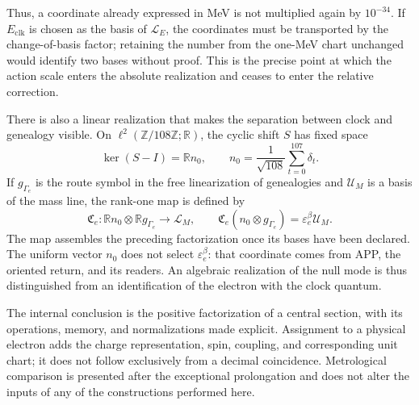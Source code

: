 Thus, a coordinate already expressed in MeV is not multiplied again
by \(10^{-34}\). If \(E_{\mathrm{clk}}\) is chosen as the basis of
\(\mathcal L_E\), the coordinates must be transported by the
change-of-basis factor; retaining the number from the one-MeV chart
unchanged would identify two bases without proof. This is the precise point
at which the action scale enters the absolute realization and ceases to
enter the relative correction.

There is also a linear realization that makes the separation
between clock and genealogy visible. On
\(\ell^2(\mathbb Z/108\mathbb Z;\mathbb R)\), the cyclic
shift \(S\) has fixed space
\[
 \ker(S-I)=\mathbb R n_0,\qquad
 n_0=\frac1{\sqrt{108}}\sum_{t=0}^{107}\delta_t.
\]
If \(g_{\Gamma_e}\) is the route symbol in the free linearization
of genealogies and \(\mathcal U_M\) is a basis of the mass line,
the rank-one map is defined by
\begin{equation}
 \mathfrak C_e:
 \mathbb R n_0\otimes\mathbb R g_{\Gamma_e}\longrightarrow\mathcal L_M,
 \qquad
 \mathfrak C_e(n_0\otimes g_{\Gamma_e})
 =\varepsilon_e^\beta\mathcal U_M.
 \label{eq:el-rango-uno}
\end{equation}
The map assembles the preceding factorization once its bases have been declared.
The uniform vector \(n_0\) does not select \(\varepsilon_e^\beta\):
that coordinate comes from APP, the oriented return, and its readers.
An algebraic realization of the null mode is thus distinguished from an
identification of the electron with the clock quantum.

The internal conclusion is the positive factorization of a central
section, with its operations, memory, and normalizations made explicit. Assignment
to a physical electron adds the charge representation,
spin, coupling, and corresponding unit chart; it does not
follow exclusively from a decimal coincidence. Metrological
comparison is presented after the exceptional prolongation and does not alter
the inputs of any of the constructions performed here.




